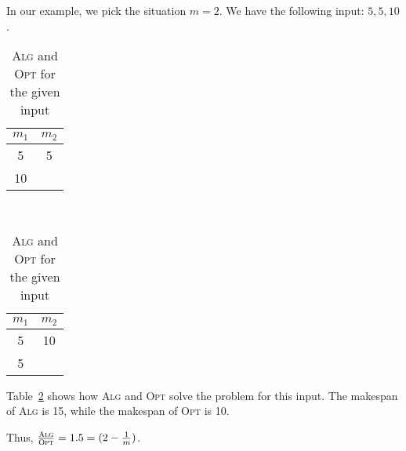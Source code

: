 In our example, we pick the situation $m = 2$.
We have the following input: $5, 5, 10$.

\begin{table}[H]
	\centering
	\begin{subtable}[b]{0.45\textwidth}
		\centering
		\begin{tabular}{c c}
			$m_1$& $m_2$\\\hline
			5& 5\\
			10& \\
		\end{tabular}
		\caption{\textsc{Alg} for this input}
		\label{tab:set1:ex1:alg}
	\end{subtable}
	~
	\begin{subtable}[b]{0.45\textwidth}
		\centering
		\begin{tabular}{c c}
			$m_1$& $m_2$\\\hline
			5& 10\\
			5& \\
		\end{tabular}
		\caption{\textsc{Opt} for this input}
		\label{tab:set1:ex1:opt}
	\end{subtable}
	\caption{\textsc{Alg} and \textsc{Opt} for the given input}
	\label{tab:set1:ex1}
\end{table}

Table~\ref{tab:set1:ex1} shows how \textsc{Alg} and \textsc{Opt} solve the problem for this input.
The makespan of \textsc{Alg} is 15, while the makespan of \textsc{Opt} is 10.

Thus, $\frac{\textsc{Alg}}{\textsc{Opt}} = 1.5 = (2 - \frac{1}{m})$.
